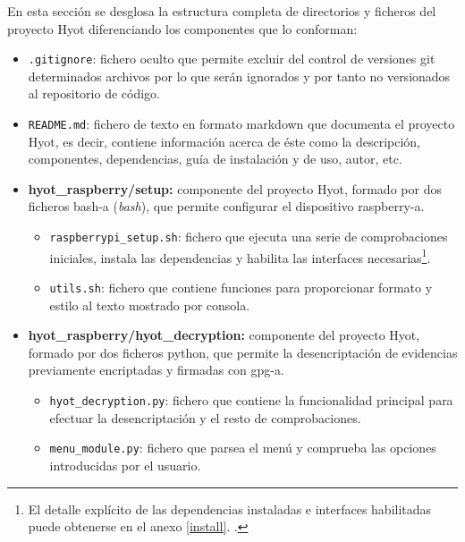 \documentclass[12pt,a4paper, twoside]{report}
\begin{document}
	En esta sección se desglosa la estructura completa de directorios y ficheros del proyecto Hyot diferenciando los componentes que lo conforman:
		
	\begin{itemize}
		\item \texttt{.gitignore}: fichero oculto que permite excluir del control de versiones \gls{git} determinados archivos por lo que serán ignorados y por tanto no versionados al repositorio de código.
		\item \texttt{README.md}: fichero de texto en formato \gls{markdown} que documenta el proyecto Hyot, es decir, contiene información acerca de éste como la descripción, componentes, dependencias, guía de instalación y de uso, autor, etc.
		
		\item \textbf{hyot\_raspberry/setup:} componente del proyecto Hyot, formado por dos ficheros \gls{bash-a} (\textit{\gls{bash}}), que permite configurar el dispositivo \gls{raspberry-a}.
		\begin{itemize}
			\item \texttt{raspberrypi\_setup.sh}: fichero que ejecuta una serie de comprobaciones iniciales, instala las dependencias y habilita las interfaces necesarias\footnote{El detalle explícito de las dependencias instaladas e interfaces habilitadas puede obtenerse en el anexo \ref{install}. .}.
			\item \texttt{utils.sh}: fichero que contiene funciones para proporcionar formato y estilo al texto mostrado por consola.
		\end{itemize}
		\item \textbf{hyot\_raspberry/hyot\_decryption:} componente del proyecto Hyot, formado por dos ficheros \gls{python}, que permite la desencriptación de evidencias previamente encriptadas y firmadas con \gls{gpg-a}.
		\begin{itemize}
			\item \texttt{hyot\_decryption.py}: fichero que contiene la funcionalidad principal para efectuar la desencriptación y el resto de comprobaciones.
			\item \texttt{menu\_module.py}: fichero que parsea el menú y comprueba las opciones introducidas por el usuario.  			
		\end{itemize}
		

\end{itemize}
\end{document}
